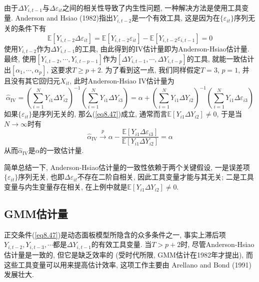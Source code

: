 \documentclass[cn, 12pt, math=mtpro2, bibstyle=apa, blue, twocol]{elegantbook}
\newcommand{\E}{\mathbb{E}}
\begin{document}
由于$\Delta Y_{i,t-1}$与$\Delta \varepsilon_{it}$之间的相关性导致了内生性问题, 一种解决方法是使用工具变量. Anderson and Hsiao (1982)指出$Y_{i,t-2}$是一个有效工具, 这是因为在$\{\varepsilon_{it}\}$序列无关的条件下有
\begin{equation}\label{eq8.47}
  \E[Y_{i,t-2}\Delta\varepsilon_{it}]=\E[Y_{i,t-2}\varepsilon_{it}]-\E[Y_{i,t-2}\varepsilon_{i,t-1}]=0
\end{equation}
使用$Y_{i,t-2}$作为$\Delta Y_{i,t-1}$的工具, 由此得到的IV估计量即为Anderson-Hsiao估计量. 最终, 使用$[Y_{i,t-2},\cdots,Y_{i,t-p-1}]$作为$[\Delta Y_{i,t-1},\cdots,\Delta Y_{i,t-p}]$的工具, 就能一致估计出$[\alpha_1,\cdots,\alpha_p]$, 这要求$T\geq p+2$. 为了看到这一点, 我们同样假定$T=3$, $p=1$, 并且没有其它回归元$X_{it}$, 此时Anderson-Hsiao IV估计量为
$$\hat{\alpha}_{\text{IV}}=\left(\sum_{i=1}^{N}Y_{i1}\Delta Y_{i2}\right)^{-1}\left(\sum_{i=1}^{N}Y_{i1}\Delta Y_{i3}\right)=\alpha+\left(\sum_{i=1}^{N}Y_{i1}\Delta Y_{i2}\right)^{-1}\left(\sum_{i=1}^{N}Y_{i1}\Delta \varepsilon_{i3}\right)$$
如果$\{\varepsilon_{it}\}$是序列无关的, 那么(\ref{eq8.47})成立, 通常而言$\E[Y_{i1}\Delta Y_{i2}]\neq0$, 于是当$N\to\infty$时有
$$\hat{\alpha}_{\text{IV}}\xrightarrow{p}\alpha-\frac{\E[Y_{i1}\Delta\varepsilon_{i3}]}{\E[Y_{i1}\Delta Y_{i2}]}=\alpha$$
从而$\hat{\alpha}_{\text{IV}}$是$\alpha$的一致估计量.

简单总结一下, Anderson-Hsiao估计量的一致性依赖于两个关键假设, 一是误差项$\{\varepsilon_{it}\}$序列无关, 也即$\Delta\varepsilon_{it}$不存在二阶自相关, 因此工具变量才能与其无关; 二是工具变量与内生变量存在相关, 在上例中就是$\E[Y_{i1}\Delta Y_{i2}]\neq0$.

\subsection{GMM估计量}
正交条件(\ref{eq8.47})是动态面板模型所隐含的众多条件之一, 事实上滞后项$Y_{i,t-2},Y_{i,t-3},\cdots$都是$\Delta Y_{i,t-1}$的有效工具变量. 当$T>p+2$时, 尽管Anderson-Hsiao估计量是一致的, 但它是缺乏效率的 (受时代所限, GMM估计在1982年才提出), 而这些工具变量可以用来提高估计效率, 这项工作主要由 Arellano and Bond (1991)发展壮大.
\end{document}
